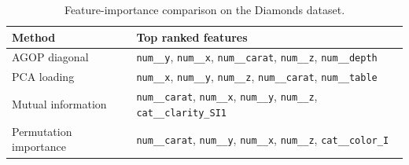 \begin{table}[H]
  \centering
  \caption{Feature-importance comparison on the Diamonds dataset.}
  \label{tab:diamonds-feature-importance}
  \small
  \begin{tabular}{ll}
    \toprule
    Method & Top ranked features \\
    \midrule
    AGOP diagonal & \texttt{num\_\_y}, \texttt{num\_\_x}, \texttt{num\_\_carat}, \texttt{num\_\_z}, \texttt{num\_\_depth} \\
    PCA loading & \texttt{num\_\_x}, \texttt{num\_\_y}, \texttt{num\_\_z}, \texttt{num\_\_carat}, \texttt{num\_\_table} \\
    Mutual information & \texttt{num\_\_carat}, \texttt{num\_\_x}, \texttt{num\_\_y}, \texttt{num\_\_z}, \texttt{cat\_\_clarity\_SI1} \\
    Permutation importance & \texttt{num\_\_carat}, \texttt{num\_\_y}, \texttt{num\_\_x}, \texttt{num\_\_z}, \texttt{cat\_\_color\_I} \\
    \bottomrule
  \end{tabular}
\end{table}